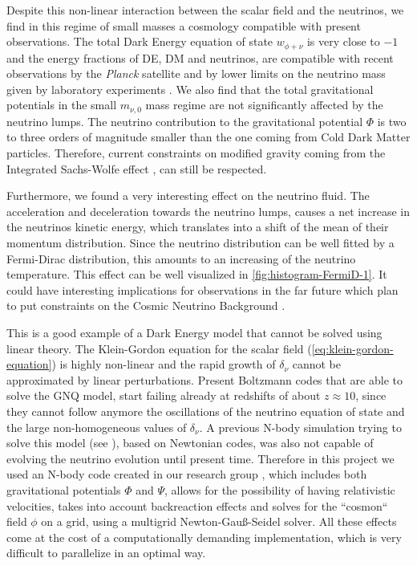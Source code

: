 Despite this non-linear interaction between the scalar field and the neutrinos, we find in this regime of small masses 
a cosmology compatible with present observations. The total Dark Energy equation of state $w_{\phi+\nu}$ is very close to $-1$
and the energy fractions of DE, DM and neutrinos, are compatible with recent observations by the \textit{Planck} satellite \cite{Planck:2015xua}
and by lower limits on the neutrino mass given by laboratory experiments \cite{klapdor2001neutrino}. We also find that
the total gravitational potentials in the small $m_{\nu,0}$ mass regime are not significantly affected by the neutrino lumps.
The neutrino contribution to the gravitational potential $\Phi$ is two to three orders of magnitude smaller than the one coming from
Cold Dark Matter particles. Therefore, current constraints on modified gravity coming from the Integrated Sachs-Wolfe effect \cite{giannantonio_combined_2008-3}, 
can still be respected.

Furthermore, we found a very interesting effect on the neutrino fluid. The acceleration and deceleration towards the neutrino lumps,
causes a net increase in the neutrinos kinetic energy, which translates into a shift of the mean of their momentum distribution. 
Since the neutrino distribution can be well fitted by a Fermi-Dirac distribution, this amounts to an increasing of the neutrino temperature.
This effect can be well visualized in \cref{fig:histogram-FermiD-1}. It could have interesting implications for observations in the
far future which plan to put constraints on the Cosmic Neutrino Background \cite{lopez1999precision}.

This is a good example of a Dark Energy model that cannot be solved using linear theory. The Klein-Gordon equation
for the scalar field (\cref{eq:klein-gordon-equation}) is highly non-linear and the rapid growth of $\delta_{\nu}$ cannot be approximated by linear perturbations. Present Boltzmann codes that are able to solve the GNQ model, start failing already at redshifts of about $z\approx 10$, since they cannot follow
anymore the oscillations of the neutrino equation of state and the large non-homogeneous values of $\delta_{\nu}$.
A previous N-body simulation trying to solve this model (see \cite{baldi_oscillating_2011}), based on Newtonian codes, was also 
not capable of evolving the neutrino evolution until present time. Therefore in this project we used an N-body code created 
in our research group \cite{ayaita_nonlinear_2016}, which includes both gravitational potentials $\Phi$ and $\Psi$,
allows for the possibility of having relativistic velocities, takes into account backreaction effects
and solves for the ``cosmon`` field $\phi$ on a grid, using a multigrid Newton-Gauß-Seidel solver.
All these effects come at the cost of a computationally demanding implementation, which is very difficult to parallelize in an optimal way.


